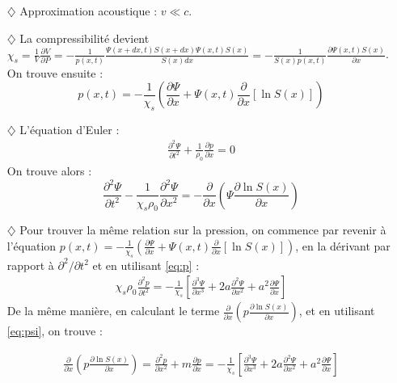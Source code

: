\documentclass{report}
\begin{document}
\begin{itemize}

\item[$\diamondsuit$] Approximation acoustique : $v\ll c$.

\item[$\diamondsuit$] La compressibilité devient $\chi_s=\frac{1}{V}\frac{\partial V}{\partial P}=-\frac{1}{p(x,t)}\frac{\Psi(x+dx,t)S(x+dx)\Psi(x,t)S(x)}{S(x)dx}=-\frac{1}{S(x)p(x,t)}\frac{\partial \Psi(x,t)S(x)}{\partial x}$. On trouve ensuite :
\begin{equation}
	p(x,t) = -\frac{1}{\chi_s}\left(\frac{\partial \Psi}{\partial x}+\Psi(x,t)\frac{\partial }{\partial x}\left[\ln S(x) \right]  \right)
	\label{eq:p}
\end{equation}

\item[$\diamondsuit$] L'équation d'Euler :
\begin{align*}
	\frac{\partial^2\Psi}{\partial t^2}+\frac{1}{\rho_0}\frac{\partial p}{\partial x}=0
\end{align*}
On trouve alors :
\begin{equation}
	\frac{\partial^2\Psi}{\partial t^2}-\frac{1}{\chi_s\rho_0}\frac{\partial^2 \Psi}{\partial x^2}=-\frac{\partial}{\partial x}\left(\Psi \frac{\partial \ln S(x)}{\partial x} \right) 
	\label{eq:psi}
\end{equation}

\item[$\diamondsuit$] Pour trouver la même relation sur la pression, on commence par revenir à l'équation $p(x,t) = -\frac{1}{\chi_s}\left(\frac{\partial \Psi}{\partial x}+\Psi(x,t)\frac{\partial }{\partial x}\left[\ln S(x) \right]  \right)$, en la dérivant par rapport à $\partial^2/\partial t^2$ et en utilisant \ref{eq:p} :
\begin{align*}
	\chi_s\rho_0\frac{\partial^2p}{\partial t^2}=-\frac{1}{\chi_s}\left[ \frac{\partial^3 \Psi}{\partial x^3}+2a\frac{\partial^2 \Psi}{\partial x^2}+a^2\frac{\partial \Psi}{\partial x}\right]
\end{align*}
De la même manière, en calculant le terme $\frac{\partial}{\partial x}\left(p \frac{\partial \ln S(x)}{\partial x} \right)$, et en utilisant \ref{eq:psi}, on trouve :

\begin{align*}
	\frac{\partial}{\partial x}\left(p \frac{\partial \ln S(x)}{\partial x} \right) = \frac{\partial^2 p}{\partial x^2}+m\frac{\partial p}{\partial x}=-\frac{1}{\chi_s}\left[ \frac{\partial^3 \Psi}{\partial x^3}+2a\frac{\partial^2 \Psi}{\partial x^2}+a^2\frac{\partial \Psi}{\partial x}\right]
\end{align*}


\end{itemize}
\end{document}
